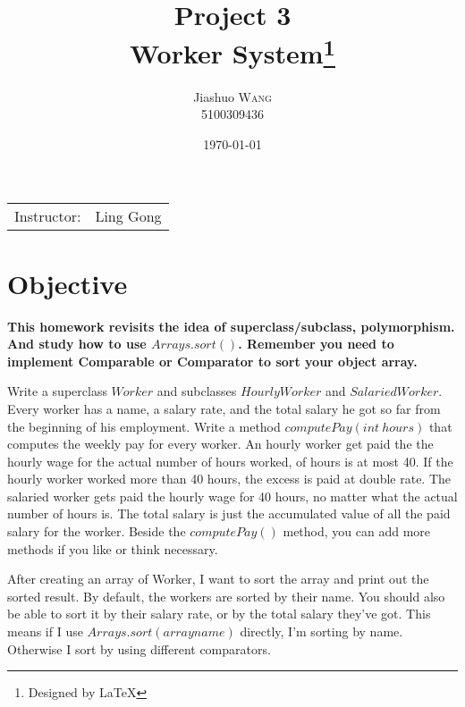 \documentclass{article}
\title{Project 3 \\ Worker System\thanks{Designed by \LaTeX}} %
\author{Jiashuo \textsc{Wang} \\ 5100309436} %
\date{\today} %
\begin{document}
\maketitle %
\thispagestyle{fancy} %

\begin{center}
\begin{tabular}{l r}
Instructor: & Ling Gong %
\end{tabular}
\end{center}




\section{Objective}

\textbf{This homework revisits the idea of superclass/subclass, polymorphism. And study how to use $Arrays.sort()$. Remember you need to implement Comparable or Comparator to sort your object array.}

 Write a superclass $Worker$ and subclasses $HourlyWorker$ and $SalariedWorker$. Every worker has a name, a salary rate, and the total salary he got so far from the beginning of his employment. Write a method  $computePay(int\ hours)$ that computes the weekly pay for every worker. An hourly worker get paid the the hourly wage for the actual number of hours worked, of hours is at most 40. If the hourly worker worked more than 40 hours, the excess is paid at double rate. The salaried worker gets paid the hourly wage for 40 hours, no matter what the actual number of hours is. The total salary is just the accumulated value of all the paid salary for the worker. Beside the $computePay()$ method, you can add more methods if you like or think necessary.

After creating an array of Worker, I want to sort the array and print out the sorted result. By default, the workers are sorted by their name. You should also be able to sort it by their salary rate, or by the total salary they've got. This means if I use $Arrays.sort(arrayname)$ directly, I'm sorting by name. Otherwise I sort by using different comparators.
\end{document}
